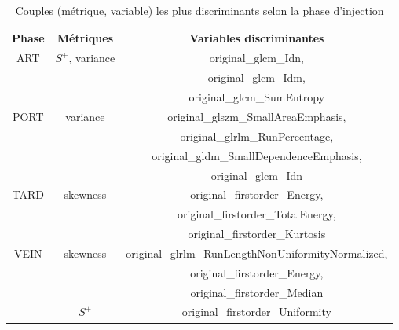 \begin{table}[H]
\centering
\tiny{
\begin{tabular}{|c|c|c|}
\hline
\textbf{Phase} & \textbf{Métriques} & \textbf{Variables discriminantes} \\
\hline
ART & $S^+$, variance & original\_glcm\_Idn,  \\
 & & original\_glcm\_Idm,  \\
 & & original\_glcm\_SumEntropy \\
\hline
PORT & variance & original\_glszm\_SmallAreaEmphasis, \\
 & & original\_glrlm\_RunPercentage,  \\
 & & original\_gldm\_SmallDependenceEmphasis, \\
 & & original\_glcm\_Idn \\
\hline
TARD & skewness & original\_firstorder\_Energy,  \\
 & & original\_firstorder\_TotalEnergy, \\
 & & original\_firstorder\_Kurtosis \\
\hline
VEIN & skewness & original\_glrlm\_RunLengthNonUniformityNormalized,  \\
 & & original\_firstorder\_Energy,  \\
 & & original\_firstorder\_Median \\
& $S^+$ & original\_firstorder\_Uniformity \\
\hline
\end{tabular}}
\caption{Couples (métrique, variable) les plus discriminants selon la phase d'injection}
\end{table}
